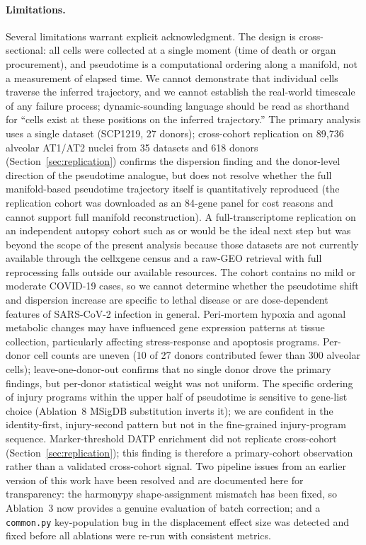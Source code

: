 \documentclass[11pt]{article}
\begin{document}
\paragraph{Limitations.} Several limitations warrant explicit acknowledgment. The design is cross-sectional: all cells were collected at a single moment (time of death or organ procurement), and pseudotime is a computational ordering along a manifold, not a measurement of elapsed time. We cannot demonstrate that individual cells traverse the inferred trajectory, and we cannot establish the real-world timescale of any failure process; dynamic-sounding language should be read as shorthand for ``cells exist at these positions on the inferred trajectory.'' The primary analysis uses a single dataset (SCP1219, 27 donors); cross-cohort replication on 89{,}736 alveolar AT1/AT2 nuclei from 35 datasets and 618 donors (Section~\ref{sec:replication}) confirms the dispersion finding and the donor-level direction of the pseudotime analogue, but does not resolve whether the full manifold-based pseudotime trajectory itself is quantitatively reproduced (the replication cohort was downloaded as an 84-gene panel for cost reasons and cannot support full manifold reconstruction). A full-transcriptome replication on an independent autopsy cohort such as \citet{Delorey2021} or \citet{Wendisch2021} would be the ideal next step but was beyond the scope of the present analysis because those datasets are not currently available through the cellxgene census and a raw-GEO retrieval with full reprocessing falls outside our available resources. The cohort contains no mild or moderate COVID-19 cases, so we cannot determine whether the pseudotime shift and dispersion increase are specific to lethal disease or are dose-dependent features of SARS-CoV-2 infection in general. Peri-mortem hypoxia and agonal metabolic changes may have influenced gene expression patterns at tissue collection, particularly affecting stress-response and apoptosis programs. Per-donor cell counts are uneven (10 of 27 donors contributed fewer than 300 alveolar cells); leave-one-donor-out confirms that no single donor drove the primary findings, but per-donor statistical weight was not uniform. The specific ordering of injury programs within the upper half of pseudotime is sensitive to gene-list choice (Ablation~8 MSigDB substitution inverts it); we are confident in the identity-first, injury-second pattern but not in the fine-grained injury-program sequence. Marker-threshold DATP enrichment did not replicate cross-cohort (Section~\ref{sec:replication}); this finding is therefore a primary-cohort observation rather than a validated cross-cohort signal. Two pipeline issues from an earlier version of this work have been resolved and are documented here for transparency: the harmonypy shape-assignment mismatch has been fixed, so Ablation~3 now provides a genuine evaluation of batch correction; and a \texttt{common.py} key-population bug in the displacement effect size was detected and fixed before all ablations were re-run with consistent metrics.
\end{document}

